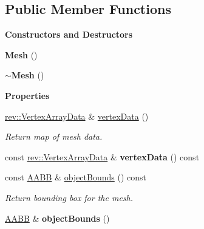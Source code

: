 \subsection*{Public Member Functions}
\begin{Indent}\textbf{ Constructors and Destructors}\par
\begin{DoxyCompactItemize}
\item 
\mbox{\label{classrev_1_1_mesh_acac6a7fc23011a53fbdf39b87117ad6a}} 
{\bfseries Mesh} ()
\item 
\mbox{\label{classrev_1_1_mesh_a1790734797f93144dcc9486f4bd76471}} 
{\bfseries $\sim$\+Mesh} ()
\end{DoxyCompactItemize}
\end{Indent}
\begin{Indent}\textbf{ Properties}\par
\begin{DoxyCompactItemize}
\item 
\mbox{\label{classrev_1_1_mesh_aabc0548279ad78b7657b488ff86add75}} 
\mbox{\hyperlink{classrev_1_1_vertex_array_data}{rev\+::\+Vertex\+Array\+Data}} \& \mbox{\hyperlink{classrev_1_1_mesh_aabc0548279ad78b7657b488ff86add75}{vertex\+Data}} ()
\begin{DoxyCompactList}\small\item\em Return map of mesh data. \end{DoxyCompactList}\item 
\mbox{\label{classrev_1_1_mesh_afc0bc775f68bbd2c27d9f865f804a81d}} 
const \mbox{\hyperlink{classrev_1_1_vertex_array_data}{rev\+::\+Vertex\+Array\+Data}} \& {\bfseries vertex\+Data} () const
\item 
\mbox{\label{classrev_1_1_mesh_a6122b212526a881e9b083a6e86553b99}} 
const \mbox{\hyperlink{classrev_1_1_a_a_b_b}{A\+A\+BB}} \& \mbox{\hyperlink{classrev_1_1_mesh_a6122b212526a881e9b083a6e86553b99}{object\+Bounds}} () const
\begin{DoxyCompactList}\small\item\em Return bounding box for the mesh. \end{DoxyCompactList}\item 
\mbox{\label{classrev_1_1_mesh_a9ef4862bb5c7f8146dd7e4dab63451a2}} 
\mbox{\hyperlink{classrev_1_1_a_a_b_b}{A\+A\+BB}} \& {\bfseries object\+Bounds} ()
\end{DoxyCompactItemize}
\end{Indent}
